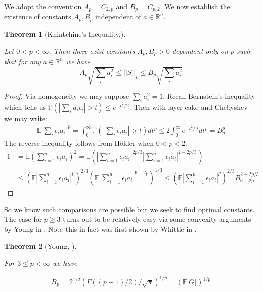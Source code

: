 \documentclass[10pt]{article}
\newcommand{\Pp}{\mathbb{P}}
\newcommand{\E}{\mathbb{E}}
\newcommand{\1}{\textbf{1}}
\newcommand{\R}{\mathbb{R}}
\newcommand{\norm}[1]{\left\lvert\left\lvert#1\right\rvert\right\rvert}
\newcommand{\normOne}[1]{\left\lvert#1\right\rvert}
\newcommand{\lparen}{\left(}
\newcommand{\rparen}{\right)}
\newtheorem{theorem}{Theorem}[subsection]
\theoremstyle{remark}
\theoremstyle{definition}
\begin{document}
We adopt the convention $A_p = C_{2,p}$ and $B_p = C_{p,2}$. We now establish the existence of constants $A_p,B_p$ independent of $a \in \R^n$.

\begin{theorem}[Khintchine's Inequality,\cite{LT}]\label{thm:RS1}

	Let $0 < p < \infty$. Then there exist constants $A_p,B_p > 0$ dependent only on $p$ such that for any $a \in \R^n$ we have 
	\begin{equation}\label{eq:RS1}
		A_p\sqrt{\sum_i a_i^2} \leq \norm{S}_p \leq B_p \sqrt{\sum_i a_i^2}
	\end{equation}
\end{theorem}

\begin{proof}
	Via homogeneity we may suppose $\sum_i a_i^2 = 1$. Recall Bernstein's inequality which tells us $\mathbb{P}\lparen\normOne{\sum_i a_i \epsilon_i} > t\rparen \leq e^{-t^2/2}$. Then with layer cake and Chebyshev we may write:
	\begin{align*}
		\E |\sum_i \epsilon_i a_i|^p = \int_0^{\infty} \Pp(|\sum_i \epsilon_i a_i | > t) dt^p \leq 2 \int_0^{\infty} e^{-t^2/2}dt^p = B_p^p
	\end{align*}
	The reverse inequality follows from H\"older when $0 < p < 2$. 
	\begin{align*}
		1 &= \E\lparen\sum_{i=1}^n \epsilon_i a_i\rparen^2 = \E\lparen\normOne{\sum_{i=1}^n\epsilon_ia_i}^{2p/3}\normOne{\sum_{i=1}^n\epsilon_ia_i}^{2-2p/3}\rparen \\
		&\leq \lparen\E \normOne{\sum_{i=1}^n \epsilon_i a_i}^p\rparen^{2/3}\lparen\E \normOne{\sum_{i=1}^n \epsilon_i a_i}^{6-2p}\rparen^{1/3} \leq \lparen\E\normOne{\sum_{i=1}^n \epsilon_i a_i}^p\rparen^{2/3} B_{6-2p}^{2-2p/3}
	\end{align*}
\end{proof}


So we know such comparisons are possible but we seek to find optimal constants. The case for $p \geq 3$ turns out to be relatively easy via some convexity arguments by Young in \cite{Y}. Note this in fact was first shown by Whittle in \cite{W}.

\begin{theorem}[Young, \cite{Y}]\label{thm:RS2}

For $3 \leq p < \infty$ we have 

\begin{equation*}
	B_p = 2^{1/2}(\Gamma((p+1)/2)/\sqrt{\pi})^{1/p} = \lparen\E\normOne{G}\rparen^{1/p}
\end{equation*}
\end{theorem}
\end{document}
